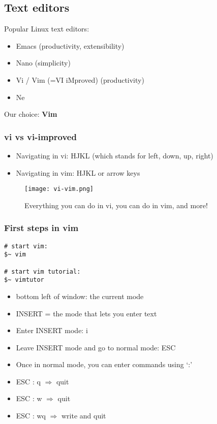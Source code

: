 \documentclass{article}
\begin{document}
\subsection{Text editors}

Popular Linux text editors:

\begin{itemize}
    \item Emacs (productivity, extensibility)
    \item Nano (simplicity)
    \item Vi / Vim (=VI iMproved) (productivity)
    \item Ne
\end{itemize}

Our choice: \textbf{Vim}

\subsubsection{vi vs vi-improved}

\begin{itemize}
    \item Navigating in vi: HJKL (which stands for left, down, up, right)
    \item Navigating in vim: HJKL or arrow keys
\end{itemize}

\begin{figure}[H]
    \centering
    \texttt{[image: vi-vim.png]}
    \caption{Everything you can do in vi, you can do in vim, and more!}
\end{figure}

\subsubsection{First steps in vim}

\begin{verbatim}
# start vim:
$~ vim

# start vim tutorial:
$~ vimtutor
\end{verbatim}

\begin{itemize}
    \item bottom left of window: the current mode
    \item INSERT = the mode that lets you enter text
    \item Enter INSERT mode: i
    \item Leave INSERT mode and go to normal mode: ESC
    \item Once in normal mode, you can enter commands using `:'
    \item ESC : q $\Rightarrow$ quit
    \item ESC : w $\Rightarrow$ quit
    \item ESC : wq $\Rightarrow$ write and quit
\end{itemize}
\end{document}
